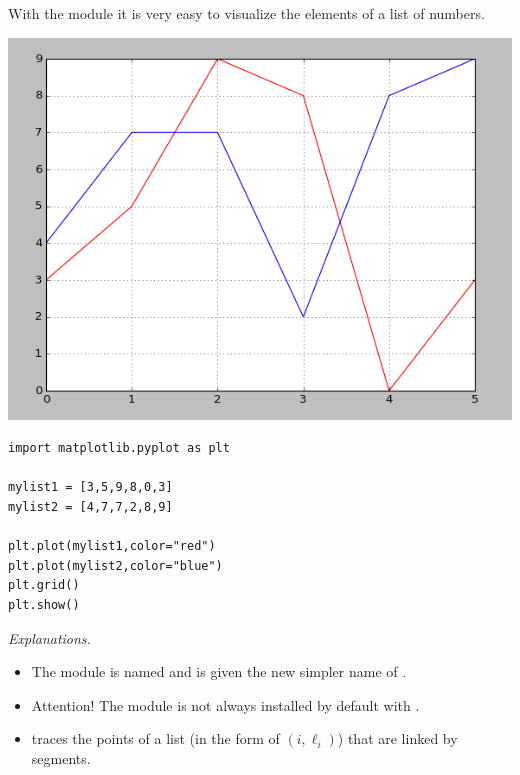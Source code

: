 \documentclass[11pt,class=report,crop=false]{standalone}
\begin{document}

\begin{cours}

With the  module it is very easy to visualize the elements of a list of numbers.


\begin{center}
\includegraphics[scale=\myscale,scale=0.45]{screen-lists-lesson-visualization}
\end{center}

\begin{lstlisting}
import matplotlib.pyplot as plt

mylist1 = [3,5,9,8,0,3]
mylist2 = [4,7,7,2,8,9]

plt.plot(mylist1,color="red")
plt.plot(mylist2,color="blue")
plt.grid()
plt.show()
\end{lstlisting}


\emph{Explanations.}
\begin{itemize}
  \item The module is named  and is given the new simpler name of .
  
  \item Attention! The  module is not always installed by default with \Python.
  
  \item {} traces the points of a list (in the form of $(i,\ell_i)$) that are linked by segments.
  

\end{itemize}
\end{cours}
\end{document}
